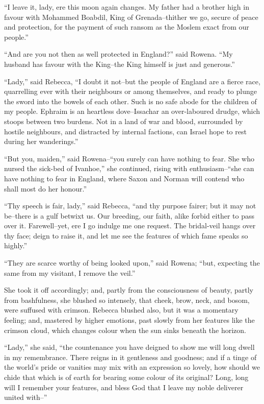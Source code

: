 ``I leave it, lady, ere this moon again changes. My father had a brother
high in favour with Mohammed Boabdil, King of Grenada--thither we go,
secure of peace and protection, for the payment of such ransom as the
Moslem exact from our people.''

``And are you not then as well protected in England?'' said Rowena. ``My
husband has favour with the King--the King himself is just and
generous.''

``Lady,'' said Rebecca, ``I doubt it not--but the people of England are
a fierce race, quarrelling ever with their neighbours or among
themselves, and ready to plunge the sword into the bowels of each other.
Such is no safe abode for the children of my people. Ephraim is an
heartless dove--Issachar an over-laboured drudge, which stoops between
two burdens. Not in a land of war and blood, surrounded by hostile
neighbours, and distracted by internal factions, can Israel hope to rest
during her wanderings.''

``But you, maiden,'' said Rowena--``you surely can have nothing to fear.
She who nursed the sick-bed of Ivanhoe,'' she continued, rising with
enthusiasm--``she can have nothing to fear in England, where Saxon and
Norman will contend who shall most do her honour.''

``Thy speech is fair, lady,'' said Rebecca, ``and thy purpose fairer;
but it may not be--there is a gulf betwixt us. Our breeding, our faith,
alike forbid either to pass over it. Farewell--yet, ere I go indulge me
one request. The bridal-veil hangs over thy face; deign to raise it, and
let me see the features of which fame speaks so highly.''

``They are scarce worthy of being looked upon,'' said Rowena; ``but,
expecting the same from my visitant, I remove the veil.''

She took it off accordingly; and, partly from the consciousness of
beauty, partly from bashfulness, she blushed so intensely, that cheek,
brow, neck, and bosom, were suffused with crimson. Rebecca blushed also,
but it was a momentary feeling; and, mastered by higher emotions, past
slowly from her features like the crimson cloud, which changes colour
when the sun sinks beneath the horizon.

``Lady,'' she said, ``the countenance you have deigned to show me will
long dwell in my remembrance. There reigns in it gentleness and
goodness; and if a tinge of the world's pride or vanities may mix with
an expression so lovely, how should we chide that which is of earth for
bearing some colour of its original? Long, long will I remember your
features, and bless God that I leave my noble deliverer united with--''

